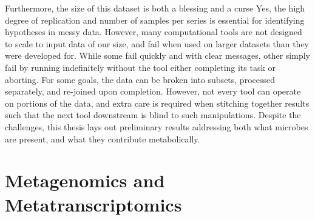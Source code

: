 Furthermore, the size of this dataset is both a blessing and a curse
Yes, the high degree of replication and number of samples per series is essential for identifying hypotheses in messy data.
However, many computational tools are not designed to scale to input data of our size, and fail when used on larger datasets than they were developed for.
While some fail quickly and with clear messages, other simply fail by running indefinitely without the tool either completing its task or aborting.
For some goals, the data can be broken into subsets, processed separately, and re-joined upon completion.
However, not every tool can operate on portions of the data, and extra care is required when stitching together results such that the next tool downstream is blind to such manipulations.
Despite the challenges, this thesis lays out preliminary results addressing both what microbes are present, and what they contribute metabolically.


\section{Metagenomics and Metatranscriptomics}




